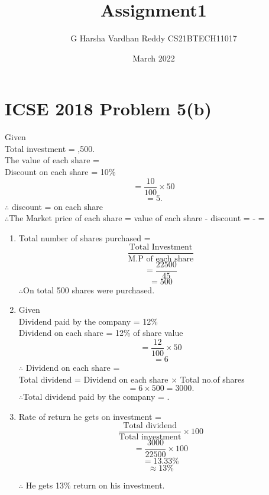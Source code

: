 \documentclass{article}
\title{Assignment1}
\author{G Harsha Vardhan Reddy CS21BTECH11017}
\date{March 2022}
\begin{document}
\maketitle
\section*{ICSE 2018 Problem 5(b)}

Given\\
Total investment = ,500.\\
The value of each share = \\
Discount on each share = 10\%  \[=\frac{10}{100}\times50\]
\[ = 5.\]
$ \therefore$ discount =  on each share\\
$\therefore$The Market price of each share = value of each share - discount =   -  = 
\begin{enumerate}
    \item 
    Total number of shares purchased =\[\frac{\text{Total Investment}}{\text{M.P of each share}}\]
    \[ = \frac{22500}{45}\]
         \[ = 500\]
    $\therefore$On total 500 shares were purchased.
    \item
    Given\\
    Dividend paid by the company = 12\%\\
    Dividend on each share = 12\% of share value  \[ = \frac{12}{100}\times 50 \]
    \[= 6\]
    $\therefore$ Dividend on each share = \\
   Total dividend = Dividend on each share $\times$ Total no.of shares
  \[ = 6 \times 500 = 3000.\]
    $\therefore$Total dividend paid by the company = .
    \item
    Rate of return he gets on investment = \[\frac{\text{Total dividend}}{\text{Total investment}} \times 100\]
    \[ = \frac{3000}{22500}\times 100\]
    \[ = 13.33\% \]
    \[\approx 13\%\]
    
    $\therefore$ He gets 13\% return on his investment.
\end{enumerate}

\end{document}
